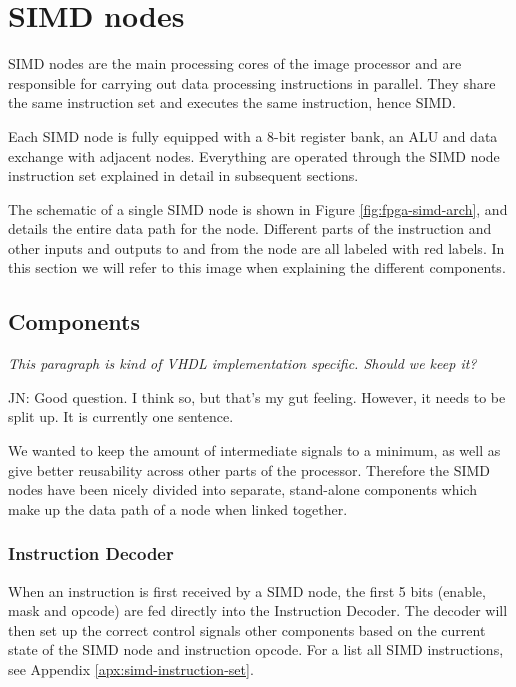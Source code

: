 \section{SIMD nodes}

\ac{SIMD} nodes are the main processing cores of the image processor and are
responsible for carrying out data processing instructions in parallel. They
share the same instruction set and executes the same instruction, hence
\acf{SIMD}.

Each \ac{SIMD} node is fully equipped with a 8-bit register bank, an \ac{ALU} and data exchange with adjacent nodes. Everything are operated through the SIMD node instruction set explained in detail in subsequent sections.

The schematic of a single \ac{SIMD} node is shown in Figure
\ref{fig:fpga-simd-arch}, and details the entire data path for the
node. Different parts of the instruction and other inputs and outputs to and
from the node are all labeled with red labels. In this
section we will refer to this image when explaining the different components.



\subsection{Components}

{\em \color{red} This paragraph is kind of VHDL implementation specific. Should
  we keep it?

  JN: Good question. I think so, but that's my gut feeling. However, it needs to
  be split up. It is currently one sentence.}

We wanted to keep the amount of intermediate signals to a minimum, as well as
give better reusability across other parts of the processor. Therefore the SIMD
nodes have been nicely divided into separate, stand-alone components which make
up the data path of a node when linked together.

\subsubsection{Instruction Decoder}

When an instruction is first received by a \ac{SIMD} node, the first 5 bits
(enable, mask and opcode) are fed directly into the Instruction Decoder. The
decoder will then set up the correct control signals other components based on
the current state of the \ac{SIMD} node and instruction opcode. For a list all
\ac{SIMD} instructions, see Appendix \ref{apx:simd-instruction-set}.

